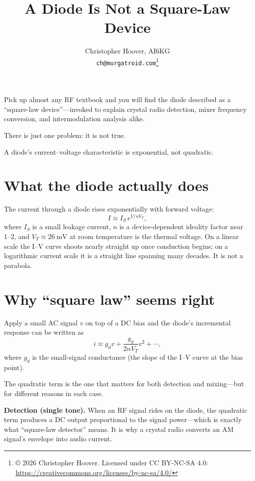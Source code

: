 \documentclass[12pt]{article}
\title{A Diode Is Not a Square-Law Device}
\author{Christopher Hoover, AI6KG \\ \texttt{ch@murgatroid.com}\thanks{\copyright{} 2026 Christopher Hoover. Licensed under CC BY-NC-SA 4.0: \url{https://creativecommons.org/licenses/by-nc-sa/4.0/}}}
\date{}
\begin{document}
\maketitle

Pick up almost any RF textbook and you will find the diode described as a ``square-law device''---invoked to explain crystal radio detection, mixer frequency conversion, and intermodulation analysis alike.

There is just one problem: it is not true.

A diode's current--voltage characteristic is exponential, not quadratic.

\section*{What the diode actually does}

The current through a diode rises exponentially with forward voltage:
\begin{equation*}
  I \approx I_S \, e^{V / n V_T},
\end{equation*}
where $I_S$ is a small leakage current, $n$ is a device-dependent ideality factor near 1--2,
and $V_T \approx \SI{26}{\milli\volt}$ at room temperature is the thermal voltage.
On a linear scale the I--V curve shoots nearly straight up once conduction begins;
on a logarithmic current scale it is a straight line spanning many decades.
It is not a parabola.

\section*{Why ``square law'' seems right}

Apply a small AC signal $v$ on top of a DC bias and the diode's incremental response can be written as
\begin{equation*}
  i \approx g_d v + \frac{g_d}{2 n V_T} v^2 + \cdots,
\end{equation*}
where $g_d$ is the small-signal conductance (the slope of the I--V curve at the bias point).

The quadratic term is the one that matters for both detection and mixing---but for different reasons in each case.

\textbf{Detection (single tone).}
When an RF signal rides on the diode, the quadratic term produces a DC output proportional to the signal power---which is exactly what ``square-law detector'' means.
It is why a crystal radio converts an AM signal's envelope into audio current.
\end{document}
